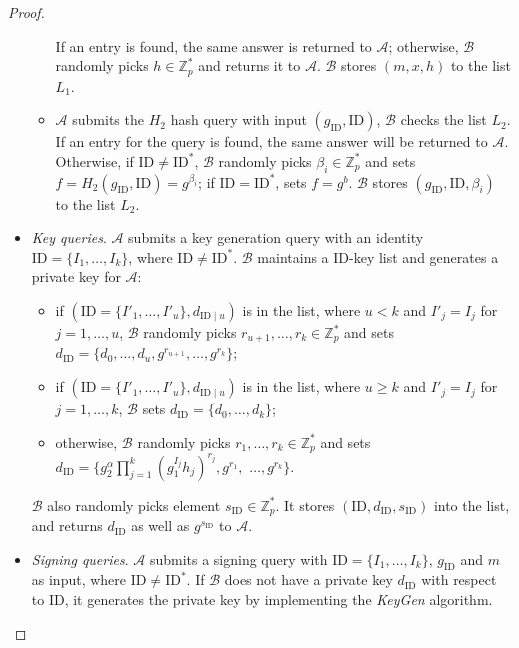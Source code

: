 \documentclass[times]{secauth}
\theoremstyle{definition}
\theoremstyle{remark}
\begin{document}
\begin{proof}
\begin{itemize}
\begin{itemize}
	If an entry is found, the same answer is returned to $\mathcal{A}$; otherwise, $\mathcal{B}$ randomly picks $h \in \mathbb{Z}_p^*$ and returns it to $\mathcal{A}$.
	$\mathcal{B}$ stores $(m, x, h)$ to the list $L_1$.
	\item $\mathcal{A}$ submits the $H_2$ hash query with input $(g_\mathrm{ID}, \mathrm{ID})$, $\mathcal{B}$ checks the list $L_2$. 
		If an entry for the query is found, the same answer will be returned to $\mathcal{A}$. 
		Otherwise, if $\mathrm{ID} \neq \mathrm{ID}^*$, $\mathcal{B}$ randomly picks $\beta_i \in \mathbb{Z}_p^*$ and sets $f = H_2(g_\mathrm{ID}, \mathrm{ID}) = g^{\beta_i}$; if $\mathrm{ID} = \mathrm{ID}^*$, sets $f = g^b$.
		$\mathcal{B}$ stores $(g_\mathrm{ID}, \mathrm{ID}, \beta_i)$ to the list $L_2$.
	\end{itemize}
	\item \emph{Key queries}. 
	$\mathcal{A}$ submits a key generation query with an identity $\mathrm{ID} = \{I_1, \ldots, I_k\}$, where $\mathrm{ID} \neq \mathrm{ID}^*$. 
	$\mathcal{B}$ maintains a ID-key list and generates a private key for $\mathcal{A}$: 
	\begin{itemize}
		\item if $(\mathrm{ID} = \{I'_1, \ldots, I'_u\}, d_{\mathrm{ID}\mid u})$ is in the list, where $u < k$ and $I'_j = I_j$ for $j = 1, \ldots, u$, $\mathcal{B}$ randomly picks $r_{u+1}, \ldots, r_k \in \mathbb{Z}_p^*$ and sets $d_{\mathrm{ID}} = \{d_0, \ldots, d_u, g^{r_{u+1}}, \ldots, g^{r_k}\}$;
		\item if $(\mathrm{ID} = \{I'_1, \ldots, I'_u\}, d_{\mathrm{ID}\mid u})$ is in the list, where $u \geqslant k$ and $I'_j = I_j$ for $j = 1, \ldots, k$, $\mathcal{B}$ sets $d_{\mathrm{ID}} = \{d_0, \ldots, d_k\}$;
		\item otherwise, $\mathcal{B}$ randomly picks $r_1, \ldots, r_k \in \mathbb{Z}_p^*$ and sets $d_{\mathrm{ID}} = \{g_2^\alpha \prod^k_{j=1}(g_1^{I_j}h_j)^{r_j}, g^{r_1},$ $ \ldots, g^{r_k}\}$. 
	\end{itemize}
	$\mathcal{B}$ also randomly picks element $s_\mathrm{ID} \in \mathbb{Z}_p^*$. 
	It stores $(\mathrm{ID}, d_\mathrm{ID}, s_\mathrm{ID})$ into the list, and returns $d_{\mathrm{ID}}$ as well as $g^{s_\mathrm{ID}}$ to $\mathcal{A}$.
	\item \emph{Signing queries}. 
	$\mathcal{A}$ submits a signing query with $\mathrm{ID} = \{I_1, \ldots, I_k\}$, $g_\mathrm{ID}$ and $m$ as input, where $\mathrm{ID} \neq \mathrm{ID}^*$.
	If $\mathcal{B}$ does not have a private key $d_{\mathrm{ID}}$ with respect to ID, it generates the private key by implementing the \emph{KeyGen} algorithm. 

\end{itemize}
\end{proof}
\end{document}
